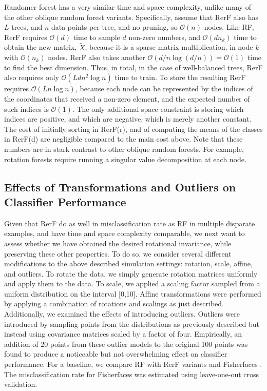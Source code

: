 \documentclass{article} %
\providecommand{\mc}[1]{\mathcal{#1}}
\providecommand{\mt}[1]{\widetilde{#1}}
\begin{document}
Randomer forest has a very similar time and space complexity, unlike many of the other oblique random forest variants.  Specifically, assume that RerF also has $L$ trees, and $n$ data points per tree, and no pruning, so $\mc O(n)$ nodes. Like RF, RerF requires $\mc{O}(d)$ time to sample $d$ non-zero numbers, and $\mc{O}(dn_k)$ time to obtain the new matrix, $\mt{X}$, because it is a sparse matrix multiplication, in node $k$ with $\mc O(n_k)$ nodes.  RerF also takes another $\mc{O}(d/n\log(d/n))=\mc O(1)$ time to find the best dimension. Thus, in total, in the case of well-balanced trees, RerF also requires only $\mc{O}(Ldn^2\log n)$ time to train.  To store the resulting RerF  requires $\mc{O}(L n\log n )$, because each node can be represented by the indices of the coordinates that received a non-zero element, and the expected number of such indices is $\mc O(1)$.  The only additional space constraint is storing which indices are positive, and which are negative, which is merely another constant.
The cost of initially sorting in RerF(r), and of computing the means of the classes in RerF(d) are negligible compared to the main cost above. Note that these numbers are in stark contrast to other oblique random forests.  For example, rotation forests require running a singular value decomposition at each node.


\subsection{Effects of Transformations and Outliers on Classifier Performance}

Given that RerF do as well in misclassification rate as RF in multiple disparate examples, and have time and space complexity comparable, we next want to assess whether we have obtained the desired rotational invariance, while preserving these other properties.  To do so, we consider several different modifications to the above described simulation settings: rotation, scale, affine, and outliers.  To rotate the data, we simply generate rotation matrices uniformly and apply them to the data.  To scale, we applied a scaling factor sampled from a uniform distribution on the interval [0,10]. 
Affine transformations were performed by applying a combination of rotations and scalings as just described. Additionally, we examined the effects of introducing outliers. Outliers were introduced by sampling points from the distributions as previously described but instead using covariance matrices scaled by a factor of four. Empirically, an addition of 20 points from these outlier models to the original 100 points was found to produce a noticeable but not overwhelming effect on classifier performance. For a baseline, we compare RF with RerF variants and Fisherfaces \cite{Fisherfaces}. The misclassification rate for Fisherfaces was estimated using leave-one-out cross validation.
\end{document}
